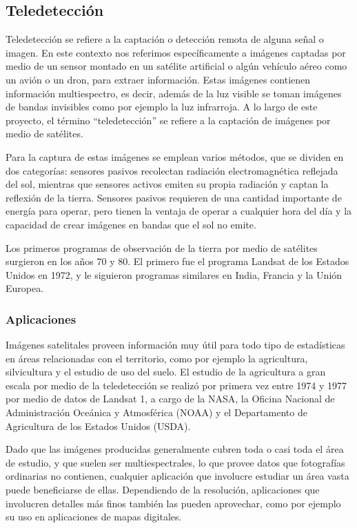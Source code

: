 \subsection{Teledetección}

Teledetección se refiere a la captación o detección remota de alguna señal o imagen. En este contexto nos referimos
específicamente a imágenes captadas por medio de un sensor montado en un satélite artificial o algún vehículo aéreo
como un avión o un dron, para extraer información. Estas imágenes contienen información multiespectro, es decir, además
de la luz visible se toman imágenes de bandas invisibles como por ejemplo la luz infrarroja.
\autocite{globalforestlink-how-sat-imaging-work} A lo largo de este proyecto, el término \enquote{teledetección} se
refiere a la captación de imágenes por medio de satélites.

Para la captura de estas imágenes se emplean varios métodos, que se dividen en dos categorías: sensores pasivos
recolectan radiación electromagnética reflejada del sol, mientras que sensores activos emiten su propia radiación y
captan la reflexión de la tierra. Sensores pasivos requieren de una cantidad importante de energía para operar, pero
tienen la ventaja de operar a cualquier hora del día y la capacidad de crear imágenes en bandas que el sol no emite.
\autocite{globalforestlink-how-sat-imaging-work}

Los primeros programas de observación de la tierra por medio de satélites surgieron en los años 70 y 80. El primero fue
el programa Landsat de los Estados Unidos en 1972, y le siguieron programas similares en India, Francia y la Unión
Europea. \autocite{esa-space-year-2007}

\subsubsection{Aplicaciones}

Imágenes satelitales proveen información muy útil para todo tipo de estadísticas en áreas relacionadas con el
territorio, como por ejemplo la agricultura, silvicultura y el estudio de uso del suelo. El estudio de la agricultura a
gran escala por medio de la teledetección se realizó por primera vez entre 1974 y 1977 por medio de datos de Landsat 1,
a cargo de la NASA, la Oficina Nacional de Administración Oceánica y Atmosférica (NOAA) y el Departamento de
Agricultura de los Estados Unidos (USDA). \autocite{allen-usda-study}

Dado que las imágenes producidas generalmente cubren toda o casi toda el área de estudio, y que suelen ser
multiespectrales, lo que provee datos que fotografías ordinarias no contienen, cualquier aplicación que involucre
estudiar un área vasta puede beneficiarse de ellas. Dependiendo de la resolución, aplicaciones que involucren detalles
más finos también las pueden aprovechar, como por ejemplo su uso en aplicaciones de mapas digitales.

